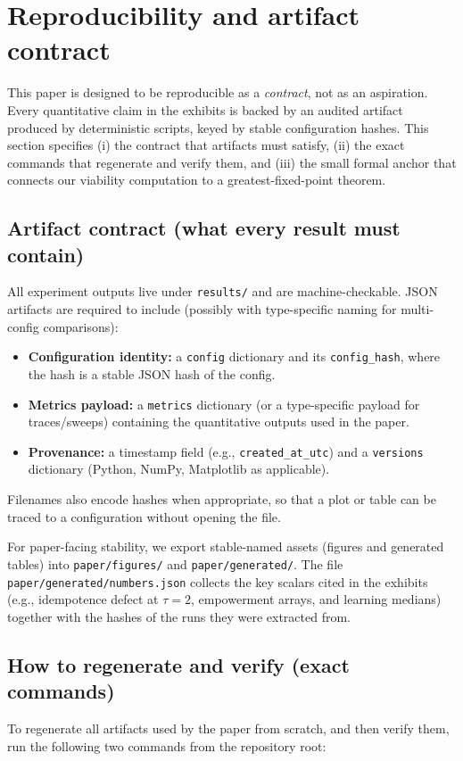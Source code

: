 \documentclass[11pt]{article}
\begin{document}
 \section{Reproducibility and artifact contract}
\label{sec:repro}

This paper is designed to be reproducible as a \emph{contract}, not as an aspiration. Every quantitative claim in the exhibits is backed by an audited artifact produced by deterministic scripts, keyed by stable configuration hashes. This section specifies (i) the contract that artifacts must satisfy, (ii) the exact commands that regenerate and verify them, and (iii) the small formal anchor that connects our viability computation to a greatest-fixed-point theorem.

\subsection{Artifact contract (what every result must contain)}
All experiment outputs live under \texttt{results/} and are machine-checkable. JSON artifacts are required to include (possibly with type-specific naming for multi-config comparisons):
\begin{itemize}[leftmargin=*, itemsep=0.25em]
  \item \textbf{Configuration identity:} a \texttt{config} dictionary and its \texttt{config\_hash}, where the hash is a stable JSON hash of the config.
  \item \textbf{Metrics payload:} a \texttt{metrics} dictionary (or a type-specific payload for traces/sweeps) containing the quantitative outputs used in the paper.
  \item \textbf{Provenance:} a timestamp field (e.g., \texttt{created\_at\_utc}) and a \texttt{versions} dictionary (Python, NumPy, Matplotlib as applicable).
\end{itemize}
Filenames also encode hashes when appropriate, so that a plot or table can be traced to a configuration without opening the file.

For paper-facing stability, we export stable-named assets (figures and generated tables) into \texttt{paper/figures/} and \texttt{paper/generated/}. The file \texttt{paper/generated/numbers.json} collects the key scalars cited in the exhibits (e.g., idempotence defect at $\tau=2$, empowerment arrays, and learning medians) together with the hashes of the runs they were extracted from.

\subsection{How to regenerate and verify (exact commands)}
To regenerate all artifacts used by the paper from scratch, and then verify them, run the following two commands from the repository root:
\end{document}
